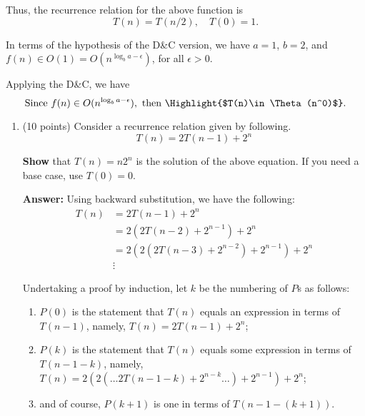 \documentclass[12pt, a4paper]{article}
\begin{document}
Thus, the recurrence relation for the above function is
\begin{equation*}
  T(n) = T(n/2), \quad T(0) = 1.
\end{equation*}

In terms of the hypothesis of the D\&C version,
we have $a=1$, $b=2$, and $f(n)\in O(1) = O(n^{\log_ba - \epsilon})$, for all $\epsilon>0$.

Applying the D\&C, we have
\begin{equation*}
  \textrm{Since}\ f(n)\in O(n^{\log_ba - \epsilon}),\ \textrm{then}\ \Highlight{$T(n)\in\Theta(n^0)$}.
\end{equation*}



\newpage



\begin{enumerate}[resume]

  \item (10 points) Consider a recurrence relation given by following.
  \begin{equation*}
    T(n) = 2T(n-1) + 2^n
  \end{equation*}
  
  \textbf{Show} that $T(n)=n2^n$ is the solution of the above equation.
  If you need a base case, use $T(0)=0$.

  \textbf{Answer:} Using backward substitution, we have the following:
  \begin{align*}
    T(n)
      &= 2T(n-1) + 2^n \\
      &= 2(2T(n-2) + 2^{n-1}) + 2^n \\
      &= 2(2(2T(n-3) + 2^{n-2}) + 2^{n-1}) + 2^n \\
      &\vdots
  \end{align*}

  Undertaking a proof by induction, let $k$ be the numbering of $P$s as follows:
  \begin{enumerate}
    
    \item $P(0)$ is the statement that $T(n)$ equals an expression in terms of $T(n-1)$,
      namely, $T(n) = 2T(n-1) + 2^n$;

    \item $P(k)$ is the statement that $T(n)$ equals some expression in terms of $T(n-1-k)$,
     namely, $T(n) = 2(2(\dots 2T(n-1-k) + 2^{n-k} \dots) + 2^{n-1}) + 2^n$;

    \item and of course, $P(k+1)$ is one in terms of $T(n-1-(k+1))$.


\end{enumerate}
\end{enumerate}
\end{document}
